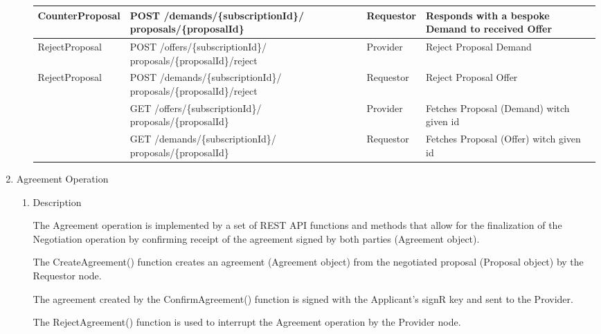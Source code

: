 \begin{enumerate}
\begin{enumerate}
\begin{table}[H]
\begin{center}
\begin{tabular}{|p{3cm}|p{7cm}|p{1.5cm}|p{4cm}|}
CounterProposal	&	POST /demands/\{subscriptionId\}/ \newline proposals/\{proposalId\}	&	Requestor	&	Responds with a bespoke Demand to received Offer \\
\hline

RejectProposal	&	POST /offers/\{subscriptionId\}/ \newline proposals/\{proposalId\}/reject & Provider & Reject Proposal Demand \\
\hline

RejectProposal	&	POST /demands/\{subscriptionId\}/ \newline proposals/\{proposalId\}/reject & Requestor & Reject Proposal Offer \\
\hline

				&	GET /offers/\{subscriptionId\}/ \newline proposals/\{proposalId\}	&	Provider	&	Fetches Proposal (Demand) witch given id \\
\hline

				&	GET /demands/\{subscriptionId\}/ \newline proposals/\{proposalId\}	&	Requestor	&	Fetches Proposal (Offer) witch given id \\
\hline

\end{tabular}
\end{center}
\end{table}

\end{enumerate}

\item  Agreement Operation

\begin{enumerate}

\item Description

The Agreement operation is implemented by a set of REST API functions and methods that allow for the finalization of the Negotiation operation by
confirming receipt of the agreement signed by both parties (Agreement object).

The CreateAgreement() function creates an agreement (Agreement object) from the negotiated proposal (Proposal object) by the Requestor node.

The agreement created by the ConfirmAgreement() function is signed with the Applicant's signR key and sent to the Provider.

The RejectAgreement() function is used to interrupt the Agreement operation by the Provider node.


\end{enumerate}
\end{enumerate}
